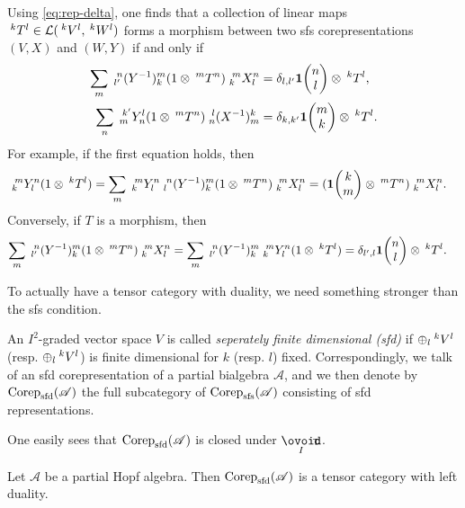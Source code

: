  \begin{Rem}\label{RemMorRep} %
 Using \eqref{eq:rep-delta}, one finds that a collection of linear maps $\Gru{T}{k}{l} \in
\mathcal{L}(\Gru{V}{k}{l},\Gru{W}{k}{l})$ forms a morphism between two sfs corepresentations
$(V,X)$ and $(W,Y)$  if
and only if
  \begin{align} 
    \sum_{m} \Gr{(Y^{-1})}{n}{m}{l'}{k}(1 \otimes
    \Gru{T}{m}{n})\Gr{X}{m}{n}{k}{l} &= \delta_{l,l'}
    \UnitC{n}{l} \otimes \Gru{T}{k}{l}, \\
    \sum_{n} \Gr{Y}{k'}{l}{m}{n}(1 \otimes
    \Gru{T}{m}{n})\Gr{(X^{-1})}{l}{k}{n}{m} &= \delta_{k,k'}
    \UnitC{m}{k} \otimes \Gru{T}{k}{l}.
 \end{align}
For example, if the first equation holds, then
\begin{align*}
  \Gr{Y}{m}{n}{k}{l} (1 \otimes \Gru{T}{k}{l}) &=
  \sum_{m}  \Gr{Y}{m}{n}{k}{l} \Gr{(Y^{-1})}{n}{m}{l}{k}(1 \otimes
  \Gru{T}{m}{n})\Gr{X}{m}{n}{k}{l} = (\UnitC{k}{m}\otimes \Gru{T}{m}{n})\Gr{X}{m}{n}{k}{l}.
\end{align*}
Conversely, if $T$ is a morphism, then
\begin{align*}
  \sum_{m} \Gr{(Y^{-1})}{n}{m}{l'}{k}(1 \otimes
  \Gru{T}{m}{n})\Gr{X}{m}{n}{k}{l} &= \sum_{m}
  \Gr{(Y^{-1})}{n}{m}{l'}{k} \Gr{Y}{m}{n}{k}{l}(1 \otimes
  \Gru{T}{k}{l}) = \delta_{l',l} \UnitC{n}{l} \otimes
  \Gru{T}{k}{l}.
\end{align*}
\end{Rem}

To actually have a tensor category with duality, we need something stronger than the sfs condition.

\begin{Def} An $I^2$-graded vector space $V$ is called \emph{seperately finite dimensional (sfd)} if $\oplus_l \Gru{V}{k}{l}$ (resp. $\oplus_l \Gru{V}{k}{l}$) is finite dimensional for $k$ (resp. $l$) fixed. Correspondingly, we talk of an sfd corepresentation of a partial bialgebra $\mathscr{A}$, and we then denote by $\Corep_{\sfd}(\mathscr{A})$ the full subcategory of $\Corep_{\sfs}(\mathscr{A})$ consisting of sfd representations. 
\end{Def} 

One easily sees that $\Corep_{\sfd}(\mathscr{A})$ is closed under $\Circt$. 

\begin{Lem} Let $\mathscr{A}$ be a partial Hopf algebra. Then $\Corep_{\sfd}(\mathscr{A})$ is a tensor category with left duality. 
\end{Lem} 

